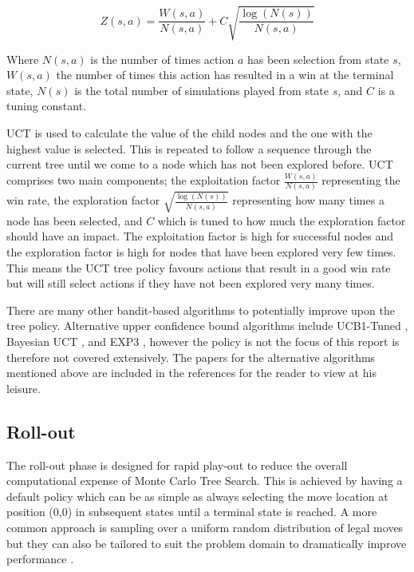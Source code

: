 \documentclass{bhamthesis}
\theoremstyle{definition}
\begin{document}
\begin{equation}\label{e:UCT}
Z(s,a) = \frac{W(s,a)}{N(s,a)} + C\sqrt{\frac{\log(N(s))}{N(s,a)}}
\end{equation} 


Where $N(s,a)$ is the number of times action $a$ has been selection from state $s$, $W(s,a)$ the number of times this action has resulted in a win at the terminal state, $N(s)$ is the total number of simulations played from state $s$, and $C$ is a tuning constant.

UCT is used to calculate the value of the child nodes and the one with the highest value is selected. This is repeated to follow a sequence through the current tree until we come to a node which has not been explored before. UCT comprises two main components; the exploitation factor $\frac{W(s,a)}{N(s,a)}$ representing the win rate, the exploration factor $\sqrt{\frac{\log(N(s))}{N(s,a)}}$ representing how many times a node has been selected, and $C$ which is tuned to how much the exploration factor should have an impact. The exploitation factor is high for successful nodes and the exploration factor is high for nodes that have been explored very few times. This means the UCT tree policy favours actions that result in a good win rate but will still select actions if they have not been explored very many times.

There are many other bandit-based algorithms to potentially improve upon the tree policy. Alternative upper confidence bound algorithms include UCB1-Tuned \cite{Auer2002}, Bayesian UCT \cite{Grunwald2010}, and EXP3 \cite{Auer1995} \cite{Audibert2009}, however the policy is not the focus of this report is therefore not covered extensively. The papers for the alternative algorithms mentioned above are included in the references for the reader to view at his leisure.

\subsection{Roll-out}\label{s:rollOut}
The roll-out phase is designed for rapid play-out to reduce the overall computational expense of Monte Carlo Tree Search. This is achieved by having a default policy which can be as simple as always selecting the move location at position (0,0) in subsequent states until a terminal state is reached. A more common approach is sampling over a uniform random distribution of legal moves but they can also be tailored to suit the problem domain to dramatically improve performance \cite{Browne2012}.
\end{document}
